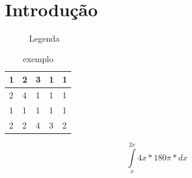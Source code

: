 \section{Introdução}
\lipsum[1]
\begin{figure}[h]
	\caption{Legenda}
	\label{fig:placeholder.jpg}
\end{figure}

\begin{table}[h]
	\centering
	\caption{exemplo}
	\label{my-label}
	\begin{tabular}{|l|l|l|l|l|}
		\hline 1 & 2 & 3 & 1 & 1 \\
		\hline 2 & 4 & 1 & 1 & 1 \\
		\hline 1 & 1 & 1 & 1 & 1 \\
		\hline 2 & 2 & 4 & 3 & 2 \\
		\hline
	\end{tabular}
\end{table}
\begin{center}
	\begin{equation}
		\int\limits_{x}^{2x} 4x*180\pi*dx
	\end{equation}
\end{center}